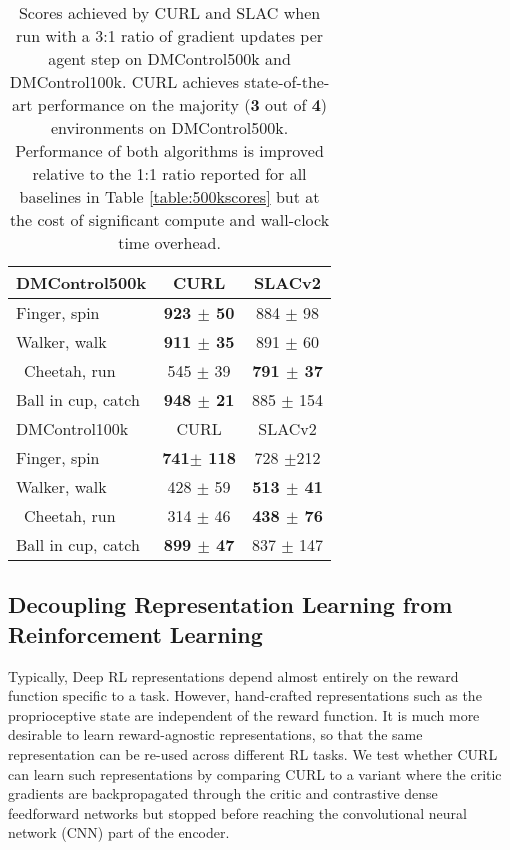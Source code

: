 \documentclass{article}
\begin{document}
\begin{table}[h!]
\caption{Scores achieved by CURL and SLAC when run with a 3:1 ratio of gradient updates per agent step on DMControl500k and DMControl100k. CURL achieves state-of-the-art performance on the majority (\textbf{3} out of \textbf{4}) environments on DMControl500k. Performance of both algorithms is improved relative to the 1:1 ratio reported for all baselines in Table \ref{table:500kscores} but at the cost of significant compute and wall-clock time overhead. }
\label{table:three_grad}
\vskip 0.15in
\begin{center}
\begin{small}
\begin{sc}
\begin{tabular}{lcc}
\toprule
DMControl500k & CURL & SLACv2 \\
\midrule
Finger, spin    & \textbf{923 $\pm$ 50} & 884 $\pm$ 98 \\
Walker, walk    & \textbf{911 $\pm$ 35} & 891  $\pm$ 60\\\
Cheetah, run    & 545 $\pm$ 39 & \textbf{791 $\pm$ 37}  \\
Ball in cup, catch   & \textbf{948 
$\pm$ 21 }  & 885 $\pm$ 154 \\
\midrule
DMControl100k & CURL & SLACv2 \\
\midrule
Finger, spin    & \textbf{ 741$\pm$ 118 }  & 728 $\pm$212  \\
Walker, walk    & 428 $\pm$ 59 & \textbf{513 $\pm$ 41}  \\\
Cheetah, run    & 314 $\pm$ 46 & \textbf{438 $\pm$ 76}  \\
Ball in cup, catch    & \textbf{ 899 $\pm$ 47 }& 837 $\pm$ 147  \\
\bottomrule
\end{tabular}
\end{sc}
\end{small}
\end{center}
\vskip -0.1in
\end{table}

 \subsection{Decoupling Representation Learning from Reinforcement Learning}

Typically, Deep RL representations depend almost entirely on the reward function specific to a task. However, hand-crafted representations such as the proprioceptive state are independent of the reward function. It is much more desirable to learn reward-agnostic representations, so that the same representation can be re-used across different RL tasks. We test whether CURL can learn such representations by comparing CURL to a variant where the critic gradients are backpropagated through the critic and contrastive dense feedforward networks but stopped before reaching the convolutional neural network (CNN) part of the encoder. 
\end{document}
